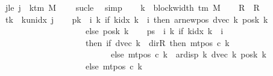 \begin{isabellebody}
\ jle{\isacharcolon}{\kern0pt}\ {\isachardoublequoteopen}j\ {\isasymle}\ k{\isacharunderscore}{\kern0pt}tm\ M\ {\isacharminus}{\kern0pt}\ {}{\isachardoublequoteclose}\ \isamarkupfalse%
\ sucle\ \isamarkupfalse%
\ simp\isanewline
\ \ \isamarkupfalse%
\ {\isacharquery}{\kern0pt}k\ {\isacharequal}{\kern0pt}\ {\isachardoublequoteopen}block{\isacharunderscore}{\kern0pt}width\ {\isacharparenleft}{\kern0pt}{\isasymGamma}{\isacharunderscore}{\kern0pt}tm\ M{\isacharparenright}{\kern0pt}{\isachardoublequoteclose}\isanewline
\ \ \isamarkupfalse%
\ {\isacharquery}{\kern0pt}R\ {\isacharequal}{\kern0pt}\ R{\isacharprime}{\kern0pt}\isanewline
\ \ \isamarkupfalse%
\ {\isacharquery}{\kern0pt}tk\ {\isacharequal}{\kern0pt}\ {\isachardoublequoteopen}k{\isacharunderscore}{\kern0pt}unidx\ j{\isachardoublequoteclose}\isanewline
\ \ \isamarkupfalse%
\ {\isacharquery}{\kern0pt}pk\ {\isacharequal}{\kern0pt}\ {\isachardoublequoteopen}{\isasymlambda}i{\isachardot}{\kern0pt}\ {\isacharparenleft}{\kern0pt}{\isasymlambda}k{\isachardot}{\kern0pt}\ if\ k{\isacharunderscore}{\kern0pt}idx\ k\ {\isacharless}{\kern0pt}\ i\ then\ ar{\isacharunderscore}{\kern0pt}newpos\ {\isacharparenleft}{\kern0pt}dvec\ k{\isacharparenright}{\kern0pt}\ {\isacharparenleft}{\kern0pt}posk{}\ k{\isacharparenright}{\kern0pt}\isanewline
\ \ \ \ \ \ \ \ \ \ \ \ \ \ \ \ \ \ \ \ else\ posk{}\ k{\isacharparenright}{\kern0pt}{\isachardoublequoteclose}\isanewline
\ \ \isamarkupfalse%
\ {\isacharquery}{\kern0pt}ps\ {\isacharequal}{\kern0pt}\ {\isachardoublequoteopen}{\isasymlambda}i{\isachardot}{\kern0pt}\ {\isacharparenleft}{\kern0pt}{\isasymlambda}k{\isachardot}{\kern0pt}\ if\ k{\isacharunderscore}{\kern0pt}idx\ k\ {\isacharless}{\kern0pt}\ i\isanewline
\ \ \ \ \ \ \ \ \ \ \ \ \ \ \ \ \ \ \ \ then\ {\isacharparenleft}{\kern0pt}if\ dvec\ k\ {\isacharequal}{\kern0pt}\ dir{\isachardot}{\kern0pt}R\ then\ mt{\isacharunderscore}{\kern0pt}pos\ c{}\ k\isanewline
\ \ \ \ \ \ \ \ \ \ \ \ \ \ \ \ \ \ \ \ \ \ \ \ \ \ else\ mt{\isacharunderscore}{\kern0pt}pos\ c{}\ k\ {\isacharminus}{\kern0pt}\ ar{\isacharunderscore}{\kern0pt}disp\ {\isacharquery}{\kern0pt}k\ {\isacharparenleft}{\kern0pt}dvec\ k{\isacharparenright}{\kern0pt}\ {\isacharparenleft}{\kern0pt}posk{}\ k{\isacharparenright}{\kern0pt}{\isacharparenright}{\kern0pt}\isanewline
\ \ \ \ \ \ \ \ \ \ \ \ \ \ \ \ \ \ \ \ else\ mt{\isacharunderscore}{\kern0pt}pos\ c{}\ k{\isacharparenright}{\kern0pt}{\isachardoublequoteclose}\isanewline

\end{isabellebody}

